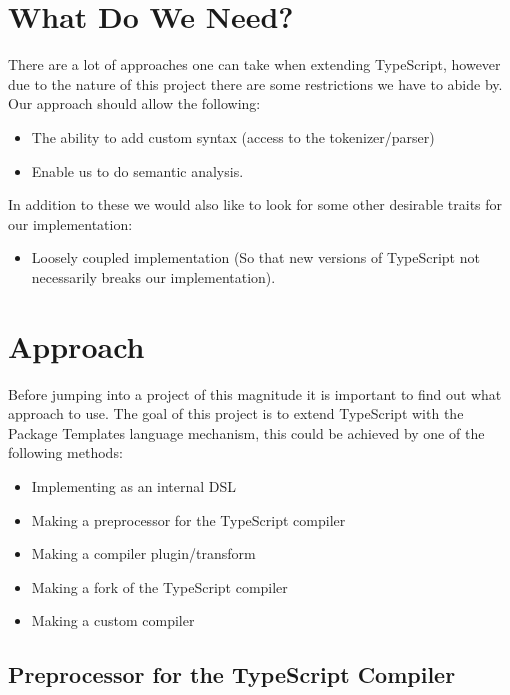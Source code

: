 \section{What Do We Need?}\label{sec:what-do-we-need}

There are a lot of approaches one can take when extending TypeScript, however due to the nature of this project there are some restrictions we have to abide by.
Our approach should allow the following:

\begin{itemize}
    \item The ability to add custom syntax (access to the tokenizer/parser)
    \item Enable us to do semantic analysis.
\end{itemize}

In addition to these we would also like to look for some other desirable traits for our implementation:

\begin{itemize}
    \item Loosely coupled implementation (So that new versions of TypeScript not necessarily breaks our implementation).
\end{itemize}


\section{Approach}\label{sec:choosing-the-right-approach}

Before jumping into a project of this magnitude it is important to find out what approach to use. 
The goal of this project is to extend TypeScript with the Package Templates language mechanism, this could be achieved by one of the following methods:

\begin{itemize}
    \item Implementing as an internal DSL
    \item Making a preprocessor for the TypeScript compiler
    \item Making a compiler plugin/transform
    \item Making a fork of the TypeScript compiler
    \item Making a custom compiler
\end{itemize}



\subsection{Preprocessor for the TypeScript Compiler}\label{subsec:preprocessor-for-the-typescript-compiler}


